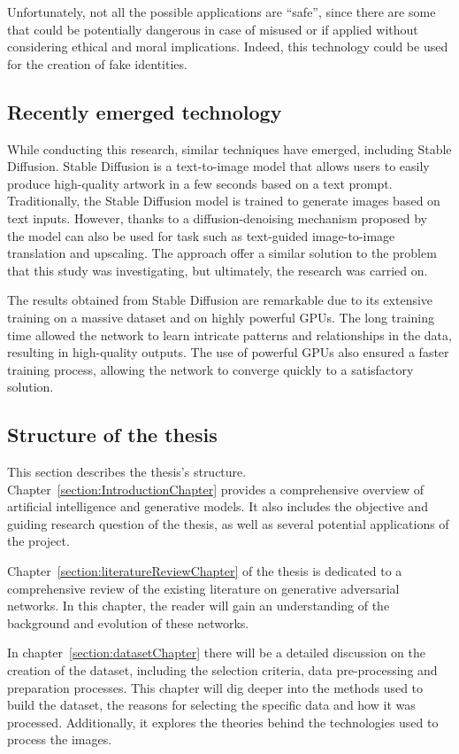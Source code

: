\noindent Unfortunately, not all the possible applications are “safe”, since there are some that could be potentially dangerous in case of misused or if applied without considering ethical and moral implications. Indeed, this technology could be used for the creation of fake identities.

\subsection{Recently emerged technology}
While conducting this research, similar techniques have emerged, including Stable Diffusion. Stable Diffusion is a text-to-image model that allows users to easily produce high-quality artwork in a few seconds based on a text prompt. Traditionally, the Stable Diffusion model is trained to generate images based on text inputs. However, thanks to a diffusion-denoising mechanism proposed by~\cite{SDEedit} the model can also be used for task such as text-guided image-to-image translation and upscaling.
%
The approach offer a similar solution to the problem that this study was investigating, but ultimately, the research was carried on.

\noindent The results obtained from Stable Diffusion are remarkable due to its extensive training on a massive dataset and on highly powerful GPUs. The long training time allowed the network to learn intricate patterns and relationships in the data, resulting in high-quality outputs. The use of powerful GPUs also ensured a faster training process, allowing the network to converge quickly to a satisfactory solution.

\subsection{Structure of the thesis}
This section describes the thesis's structure. Chapter~\ref{section:IntroductionChapter} provides a comprehensive overview of artificial intelligence and generative models. It also includes the objective and guiding research question of the thesis, as well as several potential applications of the project.

\noindent Chapter~\ref{section:literatureReviewChapter} of the thesis is dedicated to a comprehensive review of the existing literature on generative adversarial networks. In this chapter, the reader will gain an understanding of the background and evolution of these networks.

\noindent In chapter~\ref{section:datasetChapter} there will be a detailed discussion on the creation of the dataset, including the selection criteria, data pre-processing and preparation processes. This chapter will dig deeper into the methods used to build the dataset, the reasons for selecting the specific data and how it was processed. Additionally, it explores the theories behind the technologies used to process the images.

